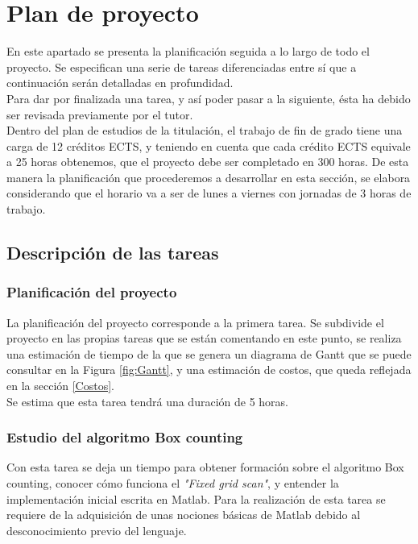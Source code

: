 \chapter{Plan de proyecto}

En este apartado se presenta la planificación seguida a lo largo de todo el proyecto. Se especifican una serie de tareas diferenciadas entre sí que a continuación serán detalladas en profundidad.\\ Para dar por finalizada una tarea, y así poder pasar a la siguiente, ésta ha debido ser revisada previamente por el tutor. \\ Dentro del plan de estudios de la titulación, el trabajo de fin de grado tiene una carga de 12 créditos ECTS, y teniendo en cuenta que cada crédito ECTS equivale a 25 horas obtenemos, que el proyecto debe ser completado en 300 horas. De esta manera la planificación que procederemos a desarrollar en esta sección, se elabora considerando que el horario va a ser de lunes a viernes con jornadas de 3 horas de trabajo.\\

\section{Descripción de las tareas}
\subsection{Planificación del proyecto}
\label{tareaPlanificacion}
La planificación del proyecto corresponde a la primera tarea. Se subdivide el proyecto en las propias tareas que se están comentando en este punto, se realiza una estimación de tiempo de la que se genera un diagrama de Gantt que se puede consultar en la Figura \ref{fig:Gantt}, y una estimación de costos, que queda reflejada en la sección \ref{Costos}.\\

Se estima que esta tarea tendrá una duración de 5 horas.

\subsection{Estudio del algoritmo Box counting}
Con esta tarea se deja un tiempo para obtener formación sobre el algoritmo Box counting, conocer cómo funciona el \textit{"Fixed grid scan"}, y entender la implementación inicial escrita en Matlab. Para la realización de esta tarea se requiere de la adquisición de unas nociones básicas de Matlab debido al desconocimiento previo del lenguaje.\\

